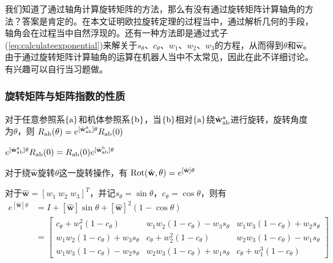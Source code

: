 \documentclass[12pt, a4paper, article, UTF8]{ctexart}
\begin{document}
我们知道了通过轴角计算旋转矩阵的方法，那么有没有通过旋转矩阵计算轴角的方法？答案是肯定的。在本文证明欧拉旋转定理的过程当中，通过解析几何的手段，轴角会在过程当中自然浮现的。还有一种方法即是通过式子(\ref{eq:calculateexponential})来解关于$s_\theta$、$c_\theta$、$w_1$、$w_2$、$w_3$的方程，从而得到$\theta$和$\hat{\mathbf{w}}$。由于通过旋转矩阵计算轴角的运算在机器人当中不太常见，因此在此不详细讨论。有兴趣可以自行当习题做。

\subsubsection{旋转矩阵与矩阵指数的性质}

\begin{mytheorem}
对于任意参照系$\{\textnormal{a}\}$和机体参照系$\{\textnormal{b}\}$，当$\{\textnormal{b}\}$相对$\{\textnormal{a}\}$绕$\hat{\mathbf{w}}_\textnormal{ab}^{\textnormal{a}}$进行旋转，旋转角度为$\theta$，则
$R_\text{ab}(\theta) = e^{[\hat{\mathbf{w}}_\textnormal{ab}^{\textnormal{a}}]\theta} R_\textnormal{ab}(0) $
\end{mytheorem}

\begin{mytheorem}
$e^{[\hat{\mathbf{w}}_\textnormal{ab}^{\textnormal{a}}]\theta} R_\textnormal{ab}(0) = R_\textnormal{ab}(0) e^{[\hat{\mathbf{w}}_\textnormal{ab}^{\textnormal{b}}]\theta}$
\end{mytheorem}

\begin{mytheorem}
对于绕$\hat{\mathbf{w}}$旋转$\theta$这一旋转操作，有
$\textnormal{Rot}(\hat{\mathbf{w}}, \theta) = e^{[\hat{\mathbf{w}}]\theta}$
\end{mytheorem}

\begin{mytheorem}
对于$\hat{\mathbf{w}} = [w_1\;w_2\;w_3]^T$，并记$s_\theta = \sin{\theta}$，$c_\theta = \cos{\theta}$，则有
\begin{align*}
e^{[\hat{\mathbf{w}}]\theta}&=I + [\hat{\mathbf{w}}]\sin\theta + [\hat{\mathbf{w}}]^2(1-\cos\theta)  \\
&= \begin{bmatrix}
c_\theta +w^2_1(1-c_\theta) & w_1w_2(1-c_\theta)-w_3s_\theta & w_1w_3(1-c_\theta)+w_2s_\theta\\
w_1w_2(1-c_\theta)+w_3s_\theta&c_\theta +w^2_2(1-c_\theta)&w_2w_3(1-c_\theta)-w_1s_\theta
\\w_1w_3(1-c_\theta)-w_2s_\theta & w_2w_3(1-c_\theta)+w_1s_\theta &c_\theta +w^3_1(1-c_\theta)
\end{bmatrix}
\end{align*}
\end{mytheorem}
\end{document}
